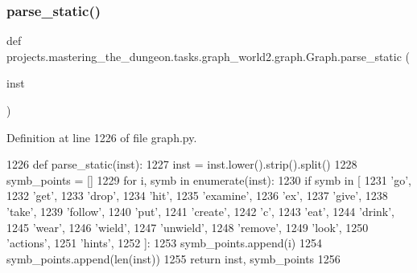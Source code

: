 \subsubsection{\texorpdfstring{parse\+\_\+static()}{parse\_static()}}
{\footnotesize\ttfamily def projects.\+mastering\+\_\+the\+\_\+dungeon.\+tasks.\+graph\+\_\+world2.\+graph.\+Graph.\+parse\+\_\+static (\begin{DoxyParamCaption}\item[{}]{inst }\end{DoxyParamCaption})\hspace{0.3cm}{\ttfamily [static]}}



Definition at line 1226 of file graph.\+py.


\begin{DoxyCode}
1226     \textcolor{keyword}{def }parse\_static(inst):
1227         inst = inst.lower().strip().split()
1228         symb\_points = []
1229         \textcolor{keywordflow}{for} i, symb \textcolor{keywordflow}{in} enumerate(inst):
1230             \textcolor{keywordflow}{if} symb \textcolor{keywordflow}{in} [
1231                 \textcolor{stringliteral}{'go'},
1232                 \textcolor{stringliteral}{'get'},
1233                 \textcolor{stringliteral}{'drop'},
1234                 \textcolor{stringliteral}{'hit'},
1235                 \textcolor{stringliteral}{'examine'},
1236                 \textcolor{stringliteral}{'ex'},
1237                 \textcolor{stringliteral}{'give'},
1238                 \textcolor{stringliteral}{'take'},
1239                 \textcolor{stringliteral}{'follow'},
1240                 \textcolor{stringliteral}{'put'},
1241                 \textcolor{stringliteral}{'create'},
1242                 \textcolor{stringliteral}{'c'},
1243                 \textcolor{stringliteral}{'eat'},
1244                 \textcolor{stringliteral}{'drink'},
1245                 \textcolor{stringliteral}{'wear'},
1246                 \textcolor{stringliteral}{'wield'},
1247                 \textcolor{stringliteral}{'unwield'},
1248                 \textcolor{stringliteral}{'remove'},
1249                 \textcolor{stringliteral}{'look'},
1250                 \textcolor{stringliteral}{'actions'},
1251                 \textcolor{stringliteral}{'hints'},
1252             ]:
1253                 symb\_points.append(i)
1254         symb\_points.append(len(inst))
1255         \textcolor{keywordflow}{return} inst, symb\_points
1256 
\end{DoxyCode}
\mbox{\label{classprojects_1_1mastering__the__dungeon_1_1tasks_1_1graph__world2_1_1graph_1_1Graph_a574ecd8c8313952047c19dc910129460}} 
